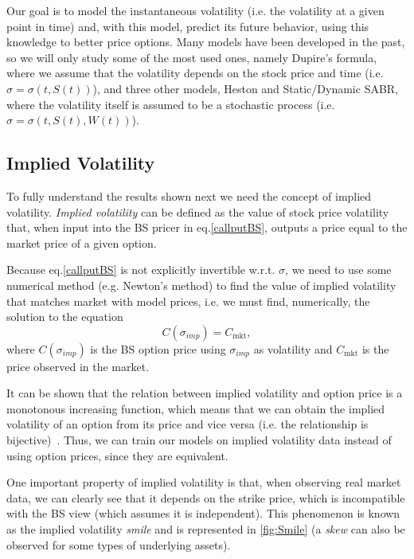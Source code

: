Our goal is to model the instantaneous volatility (i.e. the volatility at a given point in time) and, with this model, predict its future behavior, using this knowledge to better price options.
Many models have been developed in the past, so we will only study some of the most used ones, namely Dupire's formula, where we assume that the volatility depends on the stock price and time (i.e. $\sigma=\sigma(t,S(t))$), and three other models, Heston and Static/Dynamic SABR, where the volatility itself is assumed to be a stochastic process (i.e. $\sigma=\sigma(t,S(t),W(t))$).

\subsection{Implied Volatility}
To fully understand the results shown next we need the concept of implied volatility.
\emph{Implied volatility} can be defined as the value of stock price volatility that, when input into the BS pricer in eq.\eqref{callputBS}, outputs a price equal to the market price of a given option.

Because eq.\eqref{callputBS} is not explicitly invertible w.r.t. $\sigma$, we need to use some numerical method (e.g. Newton's method) to find the value of implied volatility that matches market with model prices, i.e. we must find, numerically, the solution to the equation
\begin{equation}\label{impvolform}
C(\sigma_{imp})=C_{\mathrm{mkt}},
\end{equation}
\noindent where $C(\sigma_{imp})$ is the BS option price using $\sigma_{imp}$ as volatility and $C_{\mathrm{mkt}}$ is the price observed in the market.

It can be shown that the relation between implied volatility and option price is a monotonous increasing function, which means that we can obtain the implied volatility of an option from its price and vice versa (i.e. the relationship is bijective)~\citep{Wilmott3}. Thus, we can train our models on implied volatility data instead of using option prices, since they are equivalent.

One important property of implied volatility is that, when observing real market data, we can clearly see that it depends on the strike price, which is incompatible with the BS view (which assumes it is independent).
This phenomenon is known as the implied volatility \emph{smile} and is represented in \autoref{fig:Smile} (a \emph{skew} can also be observed for some types of underlying assets).

